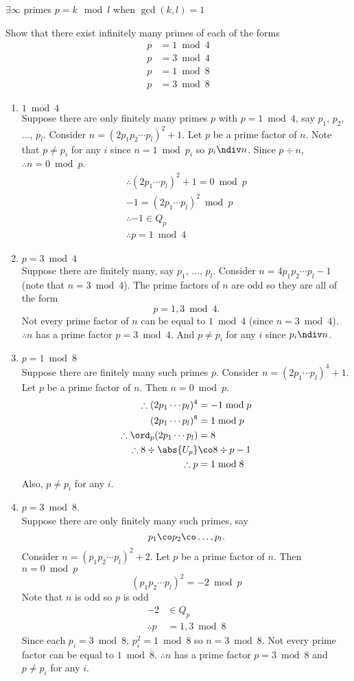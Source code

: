 $\exists\infty$ primes $p=k\mod l$ when $\gcd(k,l)=1$

\eg Show that there exist infinitely many primes of each of the forms
\begin{align}
p &= 1 \bmod 4 \\
p &= 3 \bmod 4 \\
p &= 1 \bmod 8 \\
p &= 3 \bmod 8
\end{align}
\begin{enumerate}
\item $1\bmod4$ \\
Suppose there are only finitely many primes $p$ with $p=1\bmod4$, say $p_1$, $p_2$, $\dotsc$, $p_l$.  Consider $n=(2p_1p_2\dotsm p_l)^2+1$.  Let $p$ be a prime factor of $n$.  Note that $p\neq p_i$ for any $i$ since $n=1\bmod p_i$ so $p_i\ndiv n$.  Since $p\div n$, $\therefore n=0\bmod p$.
\begin{gather*}
\therefore (2p_1\dotsm p_l)^2 + 1 = 0 \bmod p \\
-1 = (2p_1\dotsm p_l)^2 \bmod p \\
\therefore -1 \in Q_p \\
\therefore p = 1 \bmod 4
\end{gather*}
\item $p=3\bmod 4$ \\
Suppose there are finitely many, say $p_1$, $\dotsc$, $p_l$.  Consider $n=4p_1p_2\dotsm p_l-1$ (note that $n=3\bmod4$).  The prime factors of $n$ are odd so they are all of the form
\[ p = 1,3\bmod4 . \]
Not every prime factor of $n$ can be equal to $1\bmod4$ (since $n=3\bmod4$). $\therefore n$ has a prime factor $p=3\bmod4$.  And $p\neq p_i$ for any $i$ since $p_i\ndiv n$.
\item $p=1\bmod8$ \\
Suppose there are finitely many such primes $p$.  Consider $n=(2p_1\dotsm p_l)^4+1$.  Let $p$ be a prime factor of $n$.  Then $n=0\bmod p$.
\begin{align*}
\therefore (2p_1\dotsm p_l)^4&=-1\bmod p \\
(2p_1\dotsm p_l)^8 &= 1 \bmod p \\
\therefore \ord_p(2p_1\dotsm p_l) &= 8 \\
\therefore 8\div\abs{U_p}&\co8\div p-1 \\
\therefore p &= 1 \bmod 8
\end{align*}
Also, $p\neq p_i$ for any $i$.
\item $p=3\bmod 8$. \\
Suppose there are only finitely many such primes, say
\[ p_1\co p_2\co \dotsc, p_l . \]
Consider $n=(p_1p_2\dotsm p_l)^2+2$.  Let $p$ be a prime factor of $n$.  Then $n=0\bmod p$
\[ (p_1p_2\dotsm p_l)^2 = -2 \bmod p \]
Note that $n$ is odd so $p$ is odd
\begin{align*}
-2 &\in Q_p \\
\therefore p &= 1,3\bmod 8
\end{align*}
Since each $p_i=3\bmod 8$, $p_i^2=1\bmod8$ so $n=3\bmod8$.  Not every prime factor can be equal to $1\bmod8$. $\therefore n$ has a prime factor $p=3\bmod8$ and $p\neq p_i$ for any $i$.
\end{enumerate}
